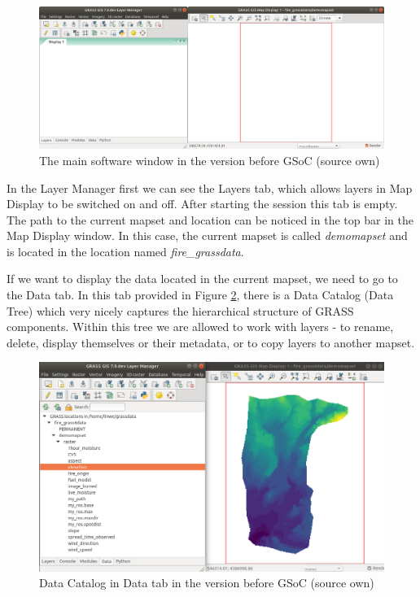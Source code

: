 \documentclass[a4paper,10pt,twoside]{article}
\begin{document}
\vspace{0.3cm}
\begin{figure}[hbt!] 
\begin{center}
\includegraphics[width=15cm]{pictures/empty_layers1.png} 
\caption[The main software window (version before GSoC)]{The main software window in the version before GSoC (source own)}
\label{fig:empty_layers1}
\end{center}
\end{figure}

In the Layer Manager first we can see the Layers tab, which allows layers in Map Display to be switched on and off. After starting the session this tab is empty. The path to the current mapset and location can be noticed in the top bar in the Map Display window. In this case, the current mapset is called \textit{demomapset} and is located in the location named \textit{fire\_grassdata}. 

If we want to display the data located in the current mapset, we need to go to the Data tab. In this tab provided in Figure \ref{fig:data_catalog_pred}, there is a Data Catalog (Data Tree) which very nicely captures the hierarchical structure of GRASS components. Within this tree we are allowed to work with layers - to rename, delete, display themselves or their metadata, or to copy layers to another mapset.

\vspace{0.3cm}
\begin{figure}[hbt!] 
\begin{center}
\includegraphics[width=14cm]{pictures/data_catalog_pred.png} 
\caption[Data Catalog in Data tab (version before GSoC)]{Data Catalog in Data tab in the version before GSoC (source own)}
\label{fig:data_catalog_pred}
\end{center}
\end{figure}
\end{document}
